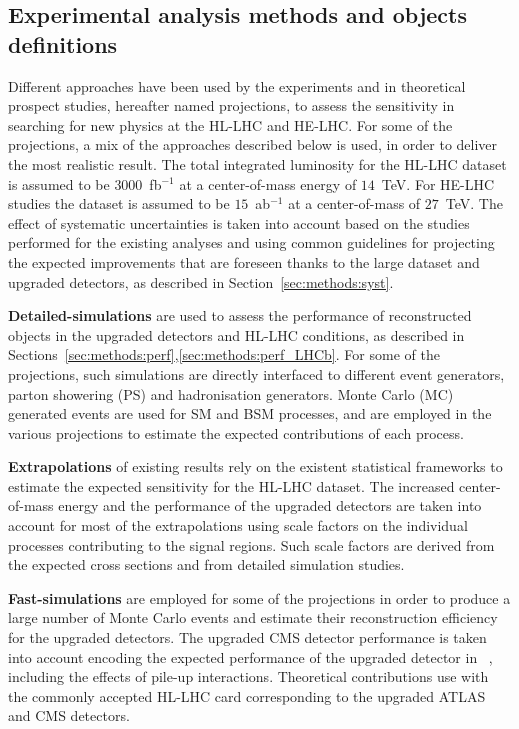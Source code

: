 
\subsection{Experimental analysis methods and objects definitions}

Different approaches have been used by the experiments and in theoretical prospect studies, hereafter named projections, to assess the sensitivity in searching for new physics at the HL-LHC and HE-LHC.
For some of the projections, a mix of the approaches described below is used, in order to deliver the most realistic result.
The total integrated luminosity for the HL-LHC dataset is assumed to be $3000$~fb$^{-1}$ at a center-of-mass energy of $14$~TeV. For HE-LHC studies the dataset is assumed to be $15$~ab$^{-1}$ at a center-of-mass of $27$~TeV.
The effect of systematic uncertainties is taken into account based on the studies performed for the existing analyses and using common guidelines for projecting the expected improvements that are foreseen thanks to the large dataset and upgraded detectors, as described in Section~\ref{sec:methods:syst}.

{\bf Detailed-simulations} are used to assess the performance of reconstructed objects in the upgraded detectors and HL-LHC conditions, as described in Sections~\ref{sec:methods:perf},\ref{sec:methods:perf_LHCb}.
For some of the projections, such simulations are directly interfaced to different event generators, parton showering (PS) and hadronisation generators. Monte Carlo (MC) generated events are used for SM and BSM processes, and are employed in the various projections to estimate the expected contributions of each process.

{\bf Extrapolations} of existing results rely on the existent statistical frameworks to estimate the expected sensitivity for the HL-LHC dataset.
The increased center-of-mass energy and the performance of the upgraded detectors are taken into account for most of the extrapolations using scale factors on the individual processes contributing to the signal regions. Such scale factors are derived from the expected cross sections and from detailed simulation studies.

{\bf Fast-simulations} are employed for some of the projections in order to produce a large number of Monte Carlo events and estimate their reconstruction efficiency for the upgraded detectors. The upgraded CMS detector performance is taken into account encoding the expected performance of the upgraded detector in \delphes~\cite{deFavereau:2013fsa}, including the effects of pile-up interactions. Theoretical contributions use \delphes with the commonly accepted HL-LHC card corresponding to the upgraded ATLAS and CMS detectors.

